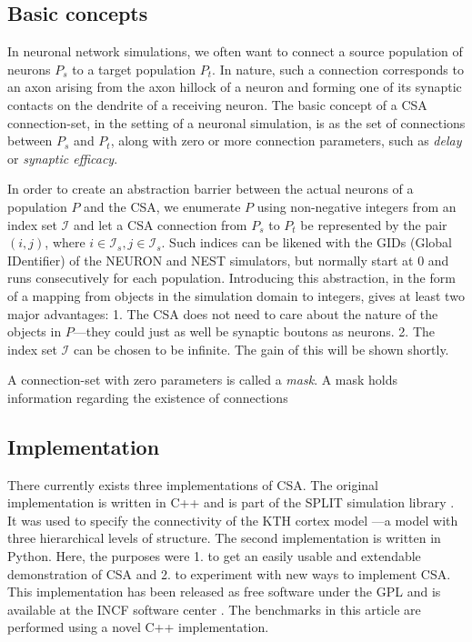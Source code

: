 \documentclass{frontiersSCNS} %
\begin{document}
\subsection{Basic concepts}

In neuronal network simulations, we often want to connect a source
population of neurons $P_s$ to a target population $P_t$.  In nature,
such a connection corresponds to an axon arising from the axon hillock
of a neuron and forming one of its synaptic contacts on the dendrite
of a receiving neuron.  The basic concept of a CSA connection-set, in
the setting of a neuronal simulation, is as the set of connections
between $P_s$ and $P_t$, along with zero or more connection
parameters, such as \emph{delay} or \emph{synaptic efficacy}.

In order to create an abstraction barrier between the actual neurons
of a population $P$ and the CSA, we enumerate $P$ using non-negative
integers from an index set $\mathcal{I}$ and let a CSA connection from
$P_s$ to $P_t$ be represented by the pair $(i, j)$, where $i \in
\mathcal{I}_s, j \in \mathcal{I}_s$.  Such indices can be likened with
the GIDs (Global IDentifier) of the NEURON and NEST simulators, but
normally start at 0 and runs consecutively for each population.
Introducing this abstraction, in the form of a mapping from objects in
the simulation domain to integers, gives at least two major
advantages: 1. The CSA does not need to care about the nature of the
objects in $P$---they could just as well be synaptic boutons as neurons.
2. The index set $\mathcal{I}$ can be chosen to be infinite.  The
gain of this will be shown shortly.

A connection-set with zero parameters is called a \emph{mask}. A mask
holds information regarding the existence of connections

\subsection{Implementation}

There currently exists three implementations of CSA.  The original
implementation is written in C++ and is part of the SPLIT simulation
library \citep{djurfeldt05}.  It was used to specify the connectivity
of the KTH cortex model \citep{djurfeldt08}---a model with three
hierarchical levels of structure.  The second implementation is
written in Python.  Here, the purposes were 1. to get an easily usable
and extendable demonstration of CSA and 2. to experiment with new ways
to implement CSA. This implementation has been released as free
software under the GPL and is available at the INCF software center
\citep{djurfeldt10}.  The benchmarks in this article are performed
using a novel C++ implementation.
\end{document}
